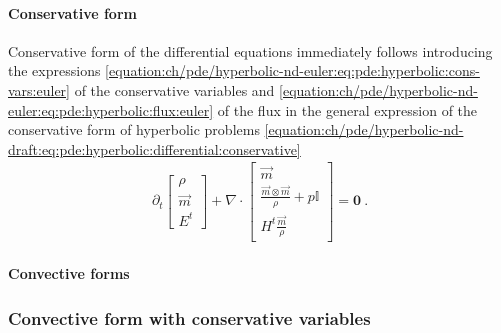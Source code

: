 \documentclass[letterpaper,10pt,english]{jupyterBook}
\begin{document}
\paragraph{Conservative form}
\label{\detokenize{ch/pde/hyperbolic-nd-euler:conservative-form}}\label{\detokenize{ch/pde/hyperbolic-nd-euler:pde-hyperbolic-nd-euler-differential-conservative}}
\sphinxAtStartPar
Conservative form of the differential equations immediately follows introducing the expressions \eqref{equation:ch/pde/hyperbolic-nd-euler:eq:pde:hyperbolic:cons-vars:euler} of the conservative variables and \eqref{equation:ch/pde/hyperbolic-nd-euler:eq:pde:hyperbolic:flux:euler} of the flux in the general expression of the conservative form of hyperbolic problems \eqref{equation:ch/pde/hyperbolic-nd-draft:eq:pde:hyperbolic:differential:conservative}
\begin{equation}\label{equation:ch/pde/hyperbolic-nd-euler:eq:pde:hyperbolic:differential:conservative:euler}
\begin{split}
  \partial_t \begin{bmatrix}  \rho \\ \vec{m} \\ E^t \end{bmatrix} + \nabla \cdot \begin{bmatrix} \vec{m} \\ \frac{\vec{m}\otimes\vec{m}}{\rho} + p \mathbb{I} \\ H^t \frac{\vec{m}}{\rho}  \end{bmatrix} = \mathbf{0} \ .
\end{split}
\end{equation}

\paragraph{Convective forms}
\label{\detokenize{ch/pde/hyperbolic-nd-euler:convective-forms}}\label{\detokenize{ch/pde/hyperbolic-nd-euler:pde-hyperbolic-nd-euler-differential-convective}}\subsubsection*{Convective form with conservative variables}
\end{document}
